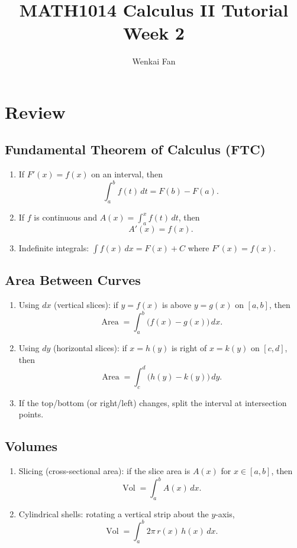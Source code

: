 \documentclass[11pt]{article}
\title{\vspace{-1.0em}MATH1014 Calculus II Tutorial\\Week 2}
\author{Wenkai Fan}
\date{}
\theoremstyle{definition}
\DeclareMathOperator{\Area}{Area}
\DeclareMathOperator{\Vol}{Vol}
\begin{document}
\maketitle
\thispagestyle{fancy}

\section{Review}

\subsection{Fundamental Theorem of Calculus (FTC)}
\begin{enumerate}
  \item If $F'(x)=f(x)$ on an interval, then
  \[
  \int_a^b f(t)\,dt=F(b)-F(a).
  \]
  \item If $f$ is continuous and $A(x)=\int_a^x f(t)\,dt$, then
  \[
  A'(x)=f(x).
  \]
  \item Indefinite integrals: $\displaystyle \int f(x)\,dx=F(x)+C$ where $F'(x)=f(x)$.
\end{enumerate}

\subsection{Area Between Curves}
\begin{enumerate}
  \item Using $dx$ (vertical slices): if $y=f(x)$ is above $y=g(x)$ on $[a,b]$, then
  \[
  \Area=\int_a^b \bigl(f(x)-g(x)\bigr)\,dx.
  \]
  \item Using $dy$ (horizontal slices): if $x=h(y)$ is right of $x=k(y)$ on $[c,d]$, then
  \[
  \Area=\int_c^d \bigl(h(y)-k(y)\bigr)\,dy.
  \]
  \item If the top/bottom (or right/left) changes, split the interval at intersection points.
\end{enumerate}

\subsection{Volumes}
\begin{enumerate}
  \item Slicing (cross-sectional area): if the slice area is $A(x)$ for $x\in[a,b]$, then
  \[
  \Vol=\int_a^b A(x)\,dx.
  \]
  \item Cylindrical shells: rotating a vertical strip about the $y$-axis,
  \[
  \Vol=\int_a^b 2\pi\,r(x)\,h(x)\,dx.
  \]
\end{enumerate}
\end{document}
